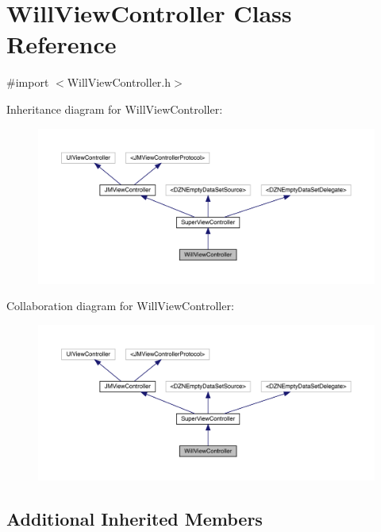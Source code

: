 \hypertarget{interface_will_view_controller}{}\section{Will\+View\+Controller Class Reference}
\label{interface_will_view_controller}


{\ttfamily \#import $<$Will\+View\+Controller.\+h$>$}



Inheritance diagram for Will\+View\+Controller\+:\nopagebreak
\begin{figure}[H]
\begin{center}
\leavevmode
\includegraphics[width=350pt]{interface_will_view_controller__inherit__graph}
\end{center}
\end{figure}


Collaboration diagram for Will\+View\+Controller\+:\nopagebreak
\begin{figure}[H]
\begin{center}
\leavevmode
\includegraphics[width=350pt]{interface_will_view_controller__coll__graph}
\end{center}
\end{figure}
\subsection*{Additional Inherited Members}


